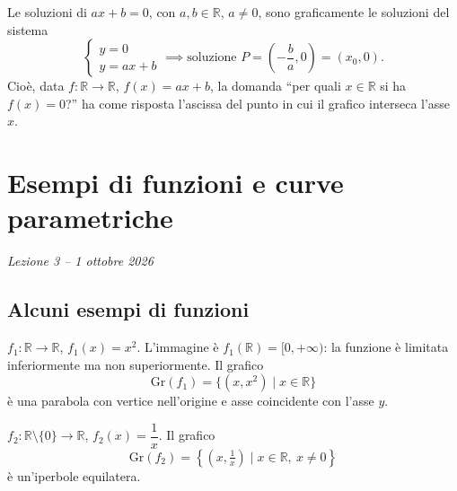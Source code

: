 \documentclass[11pt,a4paper]{article}
\begin{document}
Le soluzioni di $ax + b = 0$, con $a, b \in \mathbb{R}$, $a \neq 0$, sono graficamente le soluzioni del sistema
\[
\begin{cases} y = 0 \\ y = ax + b \end{cases}
\implies \text{soluzione } P = \left(-\frac{b}{a}, 0\right) = (x_0, 0).
\]
Cioè, data $f : \mathbb{R} \to \mathbb{R}$, $f(x) = ax + b$, la domanda ``per quali $x \in \mathbb{R}$ si ha $f(x) = 0$?'' ha come risposta l'ascissa del punto in cui il grafico interseca l'asse $x$.

\section[Esempi di funzioni e curve parametriche (Lezione 3 -- 1 ottobre 2026)]{Esempi di funzioni e curve parametriche}
\noindent\emph{Lezione 3 -- 1 ottobre 2026}
\subsection{Alcuni esempi di funzioni}

\begin{esempio}[$f_1(x) = x^2$]
$f_1 : \mathbb{R} \to \mathbb{R}$, $f_1(x) = x^2$. L'immagine è $f_1(\mathbb{R}) = [0, +\infty)$: la funzione è limitata inferiormente ma non superiormente. Il grafico
\[
\mathrm{Gr}(f_1) = \{(x, x^2) \mid x \in \mathbb{R}\}
\]
è una parabola con vertice nell'origine e asse coincidente con l'asse $y$.
\end{esempio}

\begin{esempio}[$f_2(x) = 1/x$]
$f_2 : \mathbb{R} \setminus \{0\} \to \mathbb{R}$, $f_2(x) = \dfrac1x$. Il grafico
\[
\mathrm{Gr}(f_2) = \left\{\left(x, \tfrac1x\right) \mid x \in \mathbb{R},\ x \neq 0\right\}
\]
è un'iperbole equilatera.
\end{esempio}

\begin{center}
\end{center}
\end{document}
